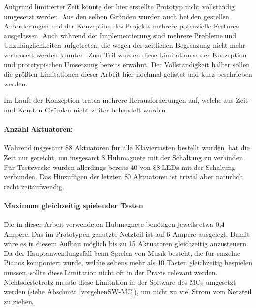 Aufgrund limitierter Zeit konnte der hier erstellte Prototyp nicht vollständig umgesetzt werden.
Aus den selben Gründen wurden auch bei den gestellen Anforderungen und der Konzeption des Projekts mehrere potenzielle Features ausgelassen.
Auch während der Implementierung sind mehrere Probleme und Unzulänglichkeiten aufgetreten, die wegen der zeitlichen Begrenzung nicht mehr verbessert werden konnten.
Zum Teil wurden diese Limitationen der Konzeption und prototypischen Umsetzung bereits erwähnt.
Der Vollständigkeit halber sollen die größten Limitationen dieser Arbeit hier nochmal gelistet und kurz beschrieben werden.

Im Laufe der Konzeption traten mehrere Herausforderungen auf, welche aus Zeit- und Konsten-Gründen nicht weiter behandelt wurden.

\paragraph{Anzahl Aktuatoren:}
Während insgesamt 88 Aktuatoren für alle Klaviertasten bestellt wurden, hat die Zeit nur gereicht, um insgesamt 8 Hubmagnete mit der Schaltung zu verbinden.
Für Testzwecke wurden allerdings bereits 40 von 88 LEDs mit der Schaltung verbunden.
Das Hinzufügen der letzten 80 Aktuatoren ist trivial aber natürlich recht zeitaufwendig.

\paragraph{Maximum gleichzeitig spielender Tasten}
Die in dieser Arbeit verwendeten Hubmagnete benötigen jeweils etwa 0,4 Ampere.
Das im Prototypen genutzte Netzteil ist auf 6 Ampere ausgelegt.
Damit wäre es in diesem Aufbau möglich bis zu 15 Aktuatoren gleichzeitig anzusteuern.
Da der Hauptanwendungsfall beim Spielen von Musik besteht, die für einzelne Pianos komponiert wurde, welche seltens mehr als 10 Tasten gleichzeitig bespielen müssen, sollte diese Limitation nicht oft in der Praxis relevant werden.
Nichtsdestotrotz musste diese Limitation in der Software des \ac{MC}s umgesetzt werden (siehe Abschnitt \ref{vorgehenSW-MC}), um nicht zu viel Strom vom Netzteil zu ziehen.

